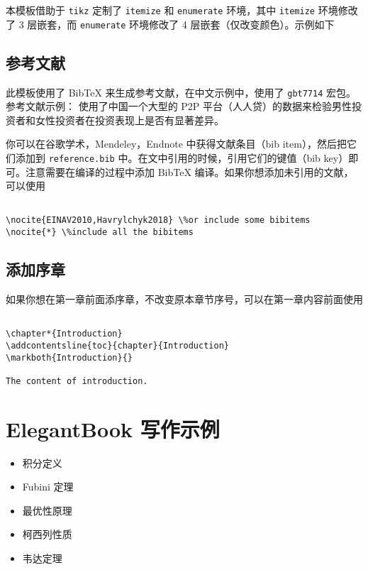 \documentclass[cn,11pt,fancy,hide]{elegantbook}
\providecommand{\tightlist}{%
  \setlength{\itemsep}{0pt}\setlength{\parskip}{0pt}}
\begin{document}
本模板借助于 \texttt{tikz} 定制了 \texttt{itemize} 和 \texttt{enumerate} 环境，其中 \texttt{itemize} 环境修改了 3 层嵌套，而 \texttt{enumerate} 环境修改了 4 层嵌套（仅改变颜色）。示例如下

\hypertarget{ref}{%
\section{参考文献}\label{ref}}

此模板使用了 BibTeX 来生成参考文献，在中文示例中，使用了 \texttt{gbt7714} 宏包。参考文献示例： 使用了中国一个大型的 P2P 平台（人人贷）的数据来检验男性投资者和女性投资者在投资表现上是否有显著差异。

你可以在谷歌学术，Mendeley，Endnote 中获得文献条目（bib item），然后把它们添加到 \texttt{reference.bib} 中。在文中引用的时候，引用它们的键值（bib key）即可。注意需要在编译的过程中添加 BibTeX 编译。如果你想添加未引用的文献，可以使用

\begin{lstlisting}

\nocite{EINAV2010,Havrylchyk2018} \%or include some bibitems
\nocite{*} \%include all the bibitems

\end{lstlisting}

\hypertarget{section-10}{%
\section{添加序章}\label{section-10}}

如果你想在第一章前面添序章，不改变原本章节序号，可以在第一章内容前面使用

\begin{lstlisting}

\chapter*{Introduction}
\addcontentsline{toc}{chapter}{Introduction} 
\markboth{Introduction}{}

The content of introduction.

\end{lstlisting}

\hypertarget{elegantbook--2}{%
\chapter{ElegantBook 写作示例}\label{elegantbook--2}}

\begin{itemize}
\tightlist
\item
  积分定义
\item
  Fubini 定理
\item
  最优性原理
\item
  柯西列性质
\item
  韦达定理
\end{itemize}
\end{document}

